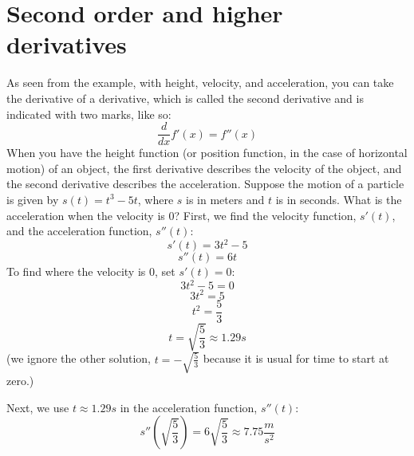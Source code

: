 \section{Second order and higher derivatives}
As seen from the example, with height, velocity, and acceleration, you can take the derivative of a derivative, which is called the second derivative and is indicated with two marks, like so: 
$$\frac{d}{dx}f'(x) = f''(x)$$
When you have the height function (or position function, in the case of horizontal motion) of an object, the first derivative describes the velocity of the object, and the second derivative describes the acceleration. Suppose the motion of a particle is given by $s(t) = t^3-5t$, where $s$ is in meters and $t$ is in seconds.  What is the acceleration when the velocity is $0$? First, we find the velocity function, $s'(t)$, and the acceleration function, $s''(t)$:
$$s'(t) = 3t^2-5$$
$$s''(t) = 6t$$
To find where the velocity is $0$, set $s'(t) = 0$:
$$3t^2-5=0$$
$$3t^2=5$$
$$t^2=\frac{5}{3}$$
$$t = \sqrt{\frac{5}{3}} \approx 1.29s$$ (we ignore the other solution, $t=-\sqrt{\frac{5}{3}}$ because it is usual for time to start at zero.)

Next, we use $t\approx 1.29s$ in the acceleration function, $s''(t)$:
$$s''(\sqrt{\frac{5}{3}}) = 6\sqrt{\frac{5}{3}} \approx 7.75 \frac{m}{s^2}$$

